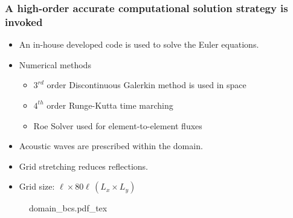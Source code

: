 \begin{frame} \frametitle{A high-order accurate computational solution strategy is invoked}
  \begin{minipage}{0.62\textwidth}
    \begin{itemize}
    \item An in-house developed code is used to solve the Euler equations.
    \item Numerical methods
      \begin{itemize}
      \item $3^{rd}$ order Discontinuous Galerkin method is used in space
      \item $4^{th}$ order Runge-Kutta time marching
      \item Roe Solver used for element-to-element fluxes
      \end{itemize}
    \item Acoustic waves are prescribed within the domain.
    \item Grid stretching reduces reflections.
    \item Grid size: $\ell \times 80\ell \, (L_x \times L_y)$
    \end{itemize}
  \end{minipage}
  \hfill%
  \begin{minipage}{0.34\textwidth}
    \begin{figure}
      \centering
      \def\svgwidth{\textwidth}
      {\footnotesize
        {domain_bcs.pdf_tex}%
      }
    \end{figure}
  \end{minipage}
\end{frame}
